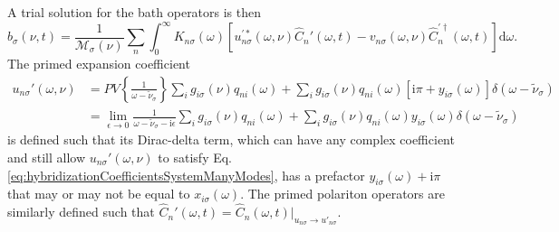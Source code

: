 A trial solution for the bath operators is then
\begin{equation}
\hat{b}_\sigma(\nu,t) = \frac{1}{\mathcal{M}_\sigma(\nu)}\sum_n\int_0^\infty K_{n\sigma}(\omega)\left[u_{n\sigma}^{\prime*}(\omega,\nu)\hat{C}_n'(\omega,t) - v_{n\sigma}(\omega,\nu)\hat{C}_n^{\prime\dagger}(\omega,t)\right]\mathrm{d}\omega.
\end{equation}
The primed expansion coefficient
\begin{equation}
\begin{split}
u_{n\sigma}'(\omega,\nu) &= PV\left\{\frac{1}{\omega - \tilde{\nu}_\sigma}\right\}\sum_ig_{i\sigma}(\nu)q_{ni}(\omega) + \sum_ig_{i\sigma}(\nu)q_{ni}(\omega)[\mathrm{i}\pi + y_{i\sigma}(\omega)]\delta(\omega - \tilde{\nu}_\sigma)\\
&= \lim_{\epsilon\to0}\frac{1}{\omega - \tilde{\nu}_\sigma - \mathrm{i}\epsilon}\sum_ig_{i\sigma}(\nu)q_{ni}(\omega) + \sum_ig_{i\sigma}(\nu)q_{ni}(\omega)y_{i\sigma}(\omega)\delta(\omega - \tilde{\nu}_\sigma)
\end{split}
\end{equation}
is defined such that its Dirac-delta term, which can have any complex coefficient and still allow $u_{n\sigma}'(\omega,\nu)$ to satisfy Eq. \eqref{eq:hybridizationCoefficientsSystemManyModes}, has a prefactor $y_{i\sigma}(\omega) + \mathrm{i}\pi$ that may or may not be equal to $x_{i\sigma}(\omega)$. The primed polariton operators are similarly defined such that $\hat{C}_n'(\omega,t) = \hat{C}_n(\omega,t)|_{u_{n\sigma}\to u'_{n\sigma}}$. 

